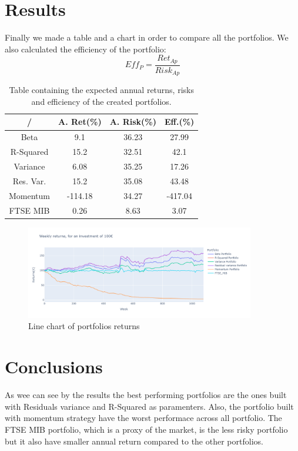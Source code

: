 \documentclass[12pt, a4paper, twocolumn]{article} %
\begin{document}
	\section{Results}
		Finally we made a table and a chart in order to compare all the portfolios.
		We also calculated the efficiency of the portfolio:
		\[
			Eff_P = \frac{Ret_{Ap}}{Risk_{Ap}}	
		\]
	\begin{table}[H]
		\centering
		\caption{Table containing the expected annual returns, risks and efficiency of the created portfolios.}
		\begin{tabular}{cccc} %
			\hline
			/ & A. Ret(\%) & A. Risk(\%) & Eff.(\%)\\
			\hline
			Beta 			& 9.1 			& 36.23 & 27.99\\
			R-Squared & 15.2 		& 32.51 & 42.1\\
			Variance 	& 6.08 		& 35.25 & 17.26\\
			Res. Var. & 15.2		& 35.08 & 43.48\\
			Momentum 		& -114.18 & 34.27 & -417.04\\
			FTSE MIB 	& 0.26 		& 8.63 	& 3.07\\
		
			\hline
		\end{tabular}
	\end{table}

		\begin{figure}[H]
			\caption{Line chart of portfolios returns}
			\begin{center}
				\includegraphics[width=100mm,scale=1.5]{port_ret_complete_small.png}
			\end{center}
		\end{figure}

	\section{Conclusions}
	As wee can see by the results the best performing portfolios are the ones built with Residuals variance and R-Squared as paramenters. Also, the portfolio built with momentum strategy have the worst performace across all portfolio. The FTSE MIB portfolio, which is a proxy of the market, is the less risky portfolio but it also have smaller annual return compared to the other portfolios. 
\nocite{*} %
\printbibliography[title={Bibliography}] %
\end{document}
